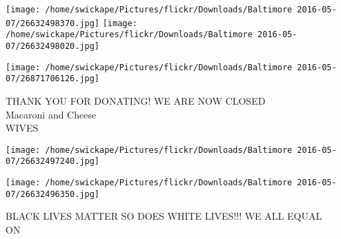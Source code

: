 \documentclass[10pt,letterpaper]{article}
\begin{document}
\texttt{[image: /home/swickape/Pictures/flickr/Downloads/Baltimore 2016-05-07/26632498370.jpg]}
\texttt{[image: /home/swickape/Pictures/flickr/Downloads/Baltimore 2016-05-07/26632498020.jpg]}

\vspace{0.25in}
\texttt{[image: /home/swickape/Pictures/flickr/Downloads/Baltimore 2016-05-07/26871706126.jpg]}

THANK YOU FOR DONATING!  WE ARE NOW CLOSED\\
Macaroni and Cheese\\
WIVES
\pagebreak

\texttt{[image: /home/swickape/Pictures/flickr/Downloads/Baltimore 2016-05-07/26632497240.jpg]}

\vspace{0.25in}
\texttt{[image: /home/swickape/Pictures/flickr/Downloads/Baltimore 2016-05-07/26632496350.jpg]}

BLACK LIVES MATTER SO DOES WHITE LIVES!!! WE ALL EQUAL\\
ON
\pagebreak
\end{document}
